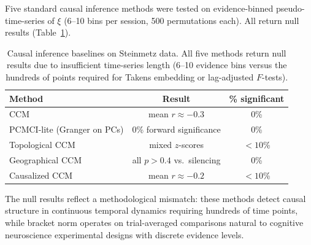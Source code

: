\documentclass[9pt,lineno]{elife}
\begin{document}
Five standard causal inference methods were tested on evidence-binned pseudo-time-series of $\xi$ (6--10 bins per session, 500 permutations each). All return null results (Table~\ref{tab:causal_baselines}).

\begin{table}[h]
\centering
\caption{Causal inference baselines on Steinmetz data. All five methods return null results due to insufficient time-series length (6--10 evidence bins versus the hundreds of points required for Takens embedding or lag-adjusted $F$-tests).}
\label{tab:causal_baselines}
\small
\begin{tabular}{lcc}
\toprule
Method & Result & \% significant \\
\midrule
CCM \citep{sugihara2012detecting} & mean $r \approx -0.3$ & 0\% \\
PCMCI-lite (Granger on PCs) & 0\% forward significance & 0\% \\
Topological CCM & mixed $z$-scores & $< 10$\% \\
Geographical CCM & all $p > 0.4$ vs.\ silencing & 0\% \\
Causalized CCM & mean $r \approx -0.2$ & $< 10$\% \\
\bottomrule
\end{tabular}
\end{table}

The null results reflect a methodological mismatch: these methods detect causal structure in continuous temporal dynamics requiring hundreds of time points, while bracket norm operates on trial-averaged comparisons natural to cognitive neuroscience experimental designs with discrete evidence levels.
\end{document}
